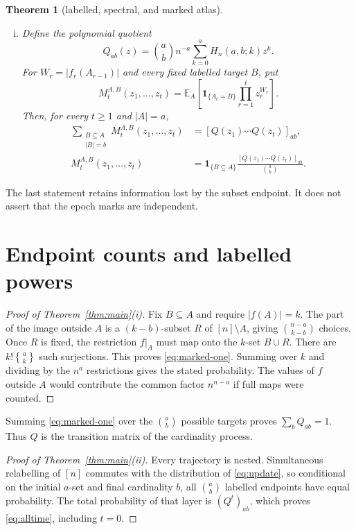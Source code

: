 \documentclass[a4paper,10pt]{amsart}
\newtheorem{theorem}{Theorem}
\theoremstyle{remark}
\newcommand{\E}{\mathbb E}
\newcommand{\ind}{\mathbf 1}
\newcommand{\Stir}[2]{\genfrac\{\}{0pt}{}{#1}{#2}}
\begin{document}
\begin{theorem}[labelled, spectral, and marked atlas]
\begin{enumerate}[(i)]
\item Define the polynomial quotient
\begin{equation}\label{eq:polyQ}
 Q_{ab}(z)=\binom ab n^{-a}\sum_{k=0}^{a}H_n(a,b;k)z^k.
\end{equation}
For $W_r=|f_r(A_{r-1})|$ and every fixed labelled target $B$, put
\begin{equation}\label{eq:fixed-mark}
 M_t^{A,B}(z_1,\ldots,z_t)=
 \E_A\!\left[\ind_{\{A_t=B\}}\prod_{r=1}^{t}z_r^{W_r}\right].
\end{equation}
Then, for every $t\ge1$ and $|A|=a$,
\begin{align}
 \sum_{\substack{B\subseteq A\\ |B|=b}}M_t^{A,B}(z_1,\ldots,z_t)
   &=[Q(z_1)\cdots Q(z_t)]_{ab},                         \label{eq:mark-aggregate}\\
 M_t^{A,B}(z_1,\ldots,z_t)
   &=\ind_{\{B\subseteq A\}}
     \frac{[Q(z_1)\cdots Q(z_t)]_{ab}}{\binom ab}.
                                                               \label{eq:mark-fixed}
\end{align}
\end{enumerate}
\end{theorem}

The last statement retains information lost by the subset endpoint.  It does
not assert that the epoch marks are independent.

\section{Endpoint counts and labelled powers}

\begin{proof}[Proof of Theorem~\ref{thm:main}(i)]
Fix $B\subseteq A$ and require $|f(A)|=k$.  The part of the image outside
$A$ is a $(k-b)$-subset $R$ of $[n]\setminus A$, giving
$\binom{n-a}{k-b}$ choices.  Once $R$ is fixed, the restriction $f|_A$ must
map onto the $k$-set $B\cup R$.  There are $k!\Stir ak$ such surjections.
This proves \eqref{eq:marked-one}.  Summing over $k$ and dividing by the
$n^a$ restrictions gives the stated probability.  The values of $f$ outside
$A$ would contribute the common factor $n^{n-a}$ if full maps were counted.
\end{proof}

Summing \eqref{eq:marked-one} over the $\binom ab$ possible targets proves
$\sum_bQ_{ab}=1$.  Thus $Q$ is the transition matrix of the cardinality
process.

\begin{proof}[Proof of Theorem~\ref{thm:main}(ii)]
Every trajectory is nested.  Simultaneous relabelling of $[n]$ commutes with
the distribution of \eqref{eq:update}, so conditional on the initial
$a$-set and final cardinality $b$, all $\binom ab$ labelled endpoints have
equal probability.  The total probability of that layer is $(Q^t)_{ab}$,
which proves \eqref{eq:alltime}, including $t=0$.
\end{proof}
\end{document}
